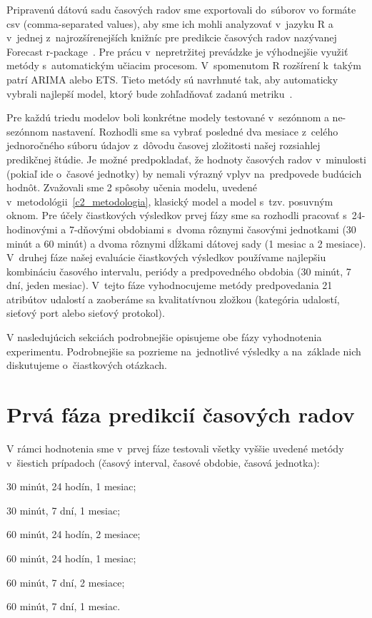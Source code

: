 \documentclass[thesismargins, thesislinespacing, openright, upjsfrontpage]{rnthesis}
\begin{document}
Pripravenú dátovú sadu časových radov sme exportovali do~súborov vo formáte csv (comma-separated values), aby sme ich mohli analyzovať v~jazyku R a v~jednej z~najrozšírenejších knižníc pre predikcie časových radov nazývanej Forecast r-package~\cite{hyndman2007automatic}. Pre prácu v~nepretržitej prevádzke je výhodnejšie využiť metódy s~automatickým učiacim procesom. V~spomenutom R rozšírení k~takým patrí ARIMA alebo ETS. Tieto metódy sú navrhnuté tak, aby automaticky vybrali najlepší model, ktorý bude zohľadňovať zadanú metriku~\cite{hyndman2007automatic}.

Pre každú triedu modelov boli konkrétne modely testované v~sezónnom a ne-sezónnom nastavení. Rozhodli sme sa vybrať posledné dva mesiace z~celého jednoročného súboru údajov z~dôvodu časovej zložitosti našej rozsiahlej predikčnej štúdie. Je možné predpokladať, že hodnoty časových radov v~minulosti (pokiaľ ide o~časové jednotky) by nemali výrazný vplyv na~predpovede budúcich hodnôt. Zvažovali sme 2 spôsoby učenia modelu, uvedené v~metodológii~\ref{c2_metodologia}, klasický model a model s~tzv. posuvným oknom. Pre účely čiastkových výsledkov prvej fázy sme sa rozhodli pracovať s~24-hodinovými a 7-dňovými obdobiami s~dvoma rôznymi časovými jednotkami (30 minút a 60 minút) a dvoma rôznymi dĺžkami dátovej sady (1 mesiac a 2 mesiace). V~druhej fáze našej evaluácie čiastkových výsledkov používame najlepšiu kombináciu časového intervalu, periódy a predpovedného obdobia (30 minút, 7 dní, jeden mesiac). V~tejto fáze vyhodnocujeme metódy predpovedania 21 atribútov udalostí a zaoberáme sa kvalitatívnou zložkou (kategória udalostí, sieťový port alebo sieťový protokol).

V nasledujúcich sekciách podrobnejšie opisujeme obe fázy vyhodnotenia experimentu. Podrobnejšie sa pozrieme na~jednotlivé výsledky a na~základe nich diskutujeme o~čiastkových otázkach.

\section{Prvá fáza predikcií časových radov}

V rámci hodnotenia sme v~prvej fáze testovali všetky vyššie uvedené metódy v~šiestich prípadoch (časový interval, časové obdobie, časová jednotka): 
\begin{compactenum}
    \item 30 minút, 24 hodín, 1 mesiac; 
    \item 30 minút, 7 dní, 1 mesiac; 
    \item 60 minút, 24 hodín, 2 mesiace; 
    \item 60 minút, 24 hodín, 1 mesiac; 
    \item 60 minút, 7 dní, 2 mesiace; 
    \item 60 minút, 7 dní, 1 mesiac.
\end{compactenum}
\end{document}
